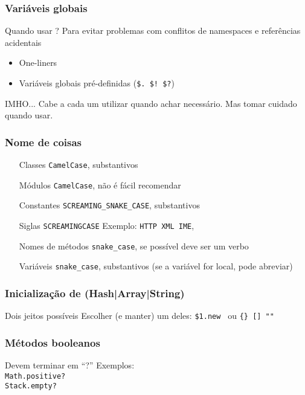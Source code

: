 \documentclass{beamer}
\begin{document}
\begin{frame}[fragile]
    \frametitle{Variáveis globais}
    \begin{block}{Quando usar ?}
        Para evitar problemas com conflitos de namespaces e referências acidentais
        \begin{itemize}
            \item One-liners
            \item Variáveis globais pré-definidas (\verb#$. $! $?#)
        \end{itemize}
    \end{block}
    \begin{block}{IMHO...}
        Cabe a cada um utilizar quando achar necessário. Mas tomar cuidado quando usar.
    \end{block}
\end{frame}

\begin{frame}[fragile]
    \frametitle{Nome de coisas}
    \begin{itemize}
        \centering
        \item[Classes] \verb#CamelCase#, substantivos
        \item[Módulos] \verb#CamelCase#, não é fácil recomendar
        \item[Constantes] \verb#SCREAMING_SNAKE_CASE#, substantivos
        \item[Siglas] \verb#SCREAMINGCASE# Exemplo: \verb#HTTP XML IME#, 
        \item[Nomes de métodos] \verb#snake_case#, se possível deve ser um verbo
        \item[Variáveis] \verb#snake_case#, substantivos (se a variável for local, pode abreviar)
    \end{itemize}
\end{frame}

\begin{frame}[fragile]
    \frametitle{Inicialização de (Hash|Array|String)}
    \begin{block}{Dois jeitos possíveis}
        Escolher (e manter) um deles: \verb#$1.new # ou \verb#{} [] ""#
    \end{block}
\end{frame}

\begin{frame}[fragile]
    \frametitle{Métodos booleanos}
    \begin{block}{Devem terminar em ``?''}
        Exemplos:\\
        \verb#Math.positive? #\\
        \verb#Stack.empty?   #\\
    \end{block}
\end{frame}
\end{document}
